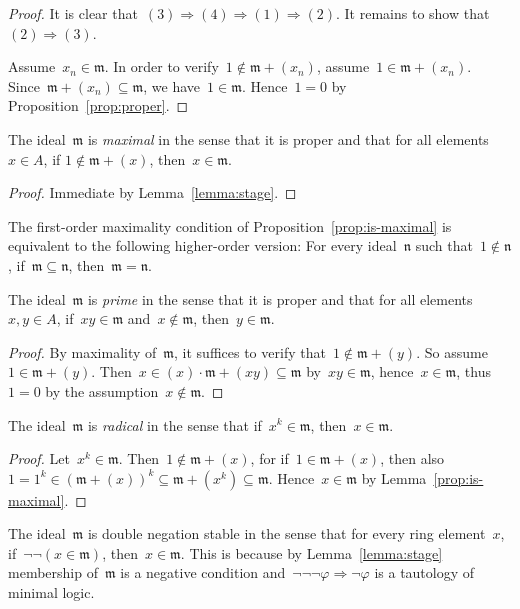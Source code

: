 \documentclass[envcountsect,envcountsame,runningheads]{llncs}
\newcommand{\mmm}{\mathfrak{m}}
\newcommand{\nnn}{\mathfrak{n}}
\renewcommand{\_}{\mathpunct{.}\,}
\begin{document}
\begin{proof}It is clear that~$(3) \Rightarrow (4) \Rightarrow (1) \Rightarrow
(2)$. It remains to show that~$(2) \Rightarrow (3)$.

Assume~$x_n \in \mmm$. In order to verify~$1 \not\in \mmm + (x_n)$,
assume~$1 \in \mmm + (x_n)$. Since~$\mmm + (x_n) \subseteq \mmm$,
we have~$1 \in \mmm$. Hence~$1 = 0$ by Proposition~\ref{prop:proper}.\end{proof}

\begin{proposition}\label{prop:is-maximal}The ideal~$\mmm$ is \emph{maximal} in the sense that it is proper and that for
all elements~$x \in A$, if $1 \not\in \mmm + (x)$, then~$x \in \mmm$.\end{proposition}

\begin{proof}Immediate by Lemma~\ref{lemma:stage}.\end{proof}

The first-order maximality condition of Proposition~\ref{prop:is-maximal} is
equivalent to the following higher-order version: For every ideal~$\nnn$ such that~$1
\not\in \nnn$, if~$\mmm \subseteq \nnn$, then~$\mmm = \nnn$.

\begin{corollary}The ideal~$\mmm$ is \emph{prime} in the sense that it is proper and that for
all elements~$x,y \in A$, if~$xy \in \mmm$ and~$x \not\in \mmm$, then~$y \in
\mmm$.\end{corollary}

\begin{proof}By maximality of~$\mmm$, it suffices to verify that~$1 \not\in
\mmm + (y)$. So assume~$1 \in \mmm + (y)$. Then~$x \in (x) \cdot \mmm + (xy)
\subseteq \mmm$ by~$xy \in \mmm$, hence~$x \in \mmm$, thus~$1 = 0$ by the assumption~$x \not\in
\mmm$.\end{proof}

\begin{corollary}The ideal~$\mmm$ is \emph{radical} in the sense that if~$x^k \in
\mmm$, then~$x \in \mmm$.\end{corollary}

\begin{proof}Let~$x^k \in \mmm$. Then~$1 \not\in \mmm + (x)$, for if~$1 \in
\mmm + (x)$, then also~$1 = 1^k \in (\mmm + (x))^k \subseteq \mmm + (x^k)
\subseteq \mmm$. Hence~$x \in \mmm$ by Lemma~\ref{prop:is-maximal}.\end{proof}

\begin{remark}The ideal~$\mmm$ is double negation stable in the sense that for every
ring element~$x$, if~$\neg\neg(x \in \mmm)$, then~$x \in \mmm$. This is because
by Lemma~\ref{lemma:stage} membership of~$\mmm$ is a negative condition
and~$\neg\neg\neg\varphi \Rightarrow \neg\varphi$ is a tautology of minimal
logic.\end{remark}
\end{document}
